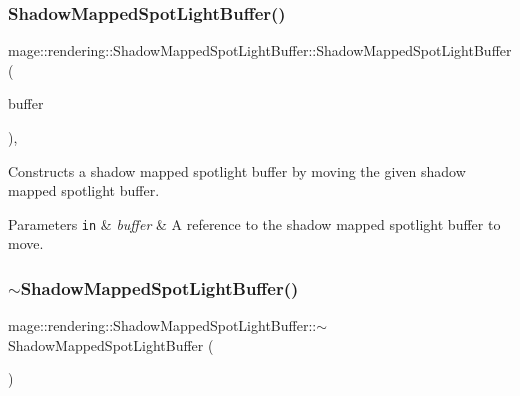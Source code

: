 \subsubsection{\texorpdfstring{Shadow\+Mapped\+Spot\+Light\+Buffer()}{ShadowMappedSpotLightBuffer()}\hspace{0.1cm}{\footnotesize\ttfamily [3/3]}}
{\footnotesize\ttfamily mage\+::rendering\+::\+Shadow\+Mapped\+Spot\+Light\+Buffer\+::\+Shadow\+Mapped\+Spot\+Light\+Buffer (\begin{DoxyParamCaption}\item[{\hyperlink{structmage_1_1rendering_1_1_shadow_mapped_spot_light_buffer}{Shadow\+Mapped\+Spot\+Light\+Buffer} \&\&}]{buffer }\end{DoxyParamCaption})\hspace{0.3cm}{\ttfamily [default]}, {\ttfamily [noexcept]}}

Constructs a shadow mapped spotlight buffer by moving the given shadow mapped spotlight buffer.


\begin{DoxyParams}[1]{Parameters}
\mbox{\tt in}  & {\em buffer} & A reference to the shadow mapped spotlight buffer to move. \\
\hline
\end{DoxyParams}
\hypertarget{structmage_1_1rendering_1_1_shadow_mapped_spot_light_buffer_ae651274fb4d113e173b62cb18191f1b9}{}\label{structmage_1_1rendering_1_1_shadow_mapped_spot_light_buffer_ae651274fb4d113e173b62cb18191f1b9} 
\subsubsection{\texorpdfstring{$\sim$\+Shadow\+Mapped\+Spot\+Light\+Buffer()}{~ShadowMappedSpotLightBuffer()}}
{\footnotesize\ttfamily mage\+::rendering\+::\+Shadow\+Mapped\+Spot\+Light\+Buffer\+::$\sim$\+Shadow\+Mapped\+Spot\+Light\+Buffer (\begin{DoxyParamCaption}{ }\end{DoxyParamCaption})\hspace{0.3cm}{\ttfamily [default]}}

